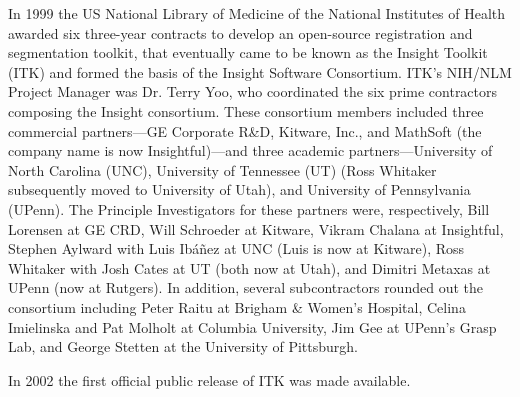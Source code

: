 In 1999 the US National Library of Medicine of the National Institutes of
Health awarded six three-year contracts to develop an open-source
registration and segmentation toolkit, that eventually came to be known as
the Insight Toolkit (ITK) and formed the basis of the Insight Software
Consortium. ITK's NIH/NLM Project Manager was Dr. Terry Yoo, who coordinated the
six prime contractors composing the Insight consortium. These consortium
members included three commercial partners---GE Corporate R\&D, Kitware,
Inc., and MathSoft (the company name is now Insightful)---and three academic
partners---University of North Carolina (UNC), University of Tennessee (UT)
(Ross Whitaker subsequently moved to University of Utah), and University of
Pennsylvania (UPenn). The Principle Investigators for these partners were,
respectively, Bill Lorensen at GE CRD, Will Schroeder at Kitware, Vikram
Chalana at Insightful, Stephen Aylward with Luis Ib\'a\~nez at UNC (Luis is now
at Kitware), Ross Whitaker with Josh Cates at UT (both now at Utah), and
Dimitri Metaxas at UPenn (now at Rutgers). In addition, several
subcontractors rounded out the consortium including Peter Raitu at Brigham \&
Women's Hospital, Celina Imielinska and Pat Molholt at Columbia University,
Jim Gee at UPenn's Grasp Lab, and George Stetten at the University of
Pittsburgh.

In 2002 the first official public release of ITK was made
available.




